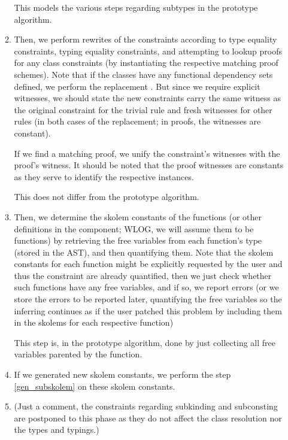 \begin{enumerate}
\begin{enumerate}
        This models the various steps regarding subtypes in the prototype algorithm.

        \item Then, we perform rewrites of the constraints according to type equality constraints, typing equality constraints, and attempting to lookup proofs for any class constraints (by instantiating the respective matching proof schemes). Note that if the classes have any functional dependency sets defined, we perform the replacement  . But since we require explicit witnesses, we should state the new constraints carry the same witness as the original constraint for the trivial rule and fresh witnesses for other rules (in both cases of the replacement; in proofs, the witnesses are constant).

        If we find a matching proof, we unify the constraint's witnesses with the proof's witness. It should be noted that the proof witnesses are constants as they serve to identify the respective instances.

        This does not differ from the prototype algorithm.

        \item Then, we determine the skolem constants of the functions (or other definitions in the component; WLOG, we will assume them to be functions) by retrieving the free variables from each function's type (stored in the AST), and then quantifying them. Note that the skolem constants for each function might be explicitly requested by the user and thus the constraint are already quantified, then we just check whether such functions have any free variables, and if so, we report errors (or we store the errors to be reported later, quantifying the free variables so the inferring continues as if the user patched this problem by including them in the skolems for each  respective function) \label{func_skolem}

        This step is, in the prototype algorithm, done by just collecting all free variables parented by the function.

        \item If we generated new skolem constants, we perform the step \ref{gen_subskolem} on these skolem constants.


        \item (Just a comment, the constraints regarding subkinding and subconsting are postponed to this phase as they do not affect the class resolution nor the types and typings.)


\end{enumerate}
\end{enumerate}
